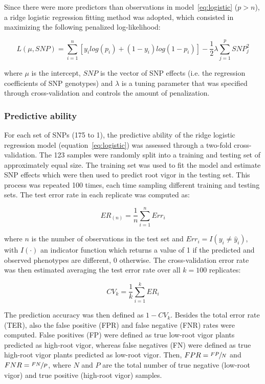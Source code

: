 Since there were more predictors than observations in
model~\ref{eq:logistic} ($p>n$), a ridge logistic regression fitting method
\cite{liu2011multilocus} was adopted, which consisted in maximizing the following
penalized log-likelihood:

\begin{equation}
L(\mu,SNP)=\sum_{i=1}^n
[y_ilog(p_i)+(1-y_i)log(1-p_i)]-\frac{1}{2}\lambda\sum_{j=1}^p SNP_j^2
\end{equation}

where $\mu$ is the intercept, $SNP$ is the vector of SNP effects (i.e. the
regression coefficients of SNP genotypes) and $\lambda$ is a tuning
parameter that was specified through cross-validation and controls the
amount of penalization.

\subsubsection{Predictive ability}
\label{par:estimating_error}
For each set of SNPs (175 to 1), the predictive ability of
the ridge logistic regression model (equation~\ref{eq:logistic}) was assessed
through a two-fold cross-validation. 
The 123 samples were randomly split into a training and testing set of approximately equal
size. The training set was used to fit the model and estimate SNP
effects which were then used to predict root vigor in the testing set. This process was repeated 100
times, each time sampling different training and testing sets.  
The test error rate in each replicate was computed as:

\begin{equation} \label{eq:testerr}
 ER_{(n)}=\frac{1}{n} \sum_{i=1}^{n} Err_i
\end{equation}

where $n$ is the number of observations in the test set and $Err_i=I(y_i \neq \hat{y}_i)$, with $I(\cdot)$ an indicator function
which returns a value of 1 if the predicted and observed phenotypes are
different, 0 otherwise. 
The cross-validation error rate was then estimated averaging the test error
rate over all $k=100$ replicates:

\begin{equation} \label{eq:cverr}
CV_{k}=\frac{1}{k} \sum_{i=1}^k ER_i
\end{equation}

The prediction accuracy was then defined as $1-CV_k$. Besides the total
error rate (TER), also the false positive (FPR) and false negative (FNR) rates
were computed. False positives (FP) were defined as true low-root vigor
plants predicted as high-root vigor, whereas false negatives (FN) were
defined as true high-root vigor plants predicted as low-root vigor.
Then, $FPR=\sfrac{FP}{N}$ and $FNR=\sfrac{FN}{P}$, where $N$ and $P$ are
the total number of true negative (low-root vigor) and true positive
(high-root vigor) samples.

